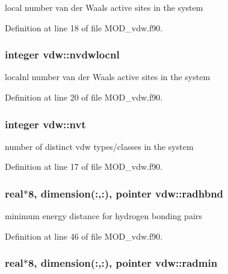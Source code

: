 local number van der Waals active sites in the system 



Definition at line 18 of file M\-O\-D\-\_\-vdw.\-f90.

\hypertarget{classvdw_ad9fb8b87e6260d7940ff961e4014ccda}{
\subsubsection[{nvdwlocnl}]{\setlength{\rightskip}{0pt plus 5cm}integer vdw\-::nvdwlocnl}}\label{classvdw_ad9fb8b87e6260d7940ff961e4014ccda}


localnl number van der Waals active sites in the system 



Definition at line 20 of file M\-O\-D\-\_\-vdw.\-f90.

\hypertarget{classvdw_a6d9a7d303d6bab7238b14f89965de887}{
\subsubsection[{nvt}]{\setlength{\rightskip}{0pt plus 5cm}integer vdw\-::nvt}}\label{classvdw_a6d9a7d303d6bab7238b14f89965de887}


number of distinct vdw types/classes in the system 



Definition at line 17 of file M\-O\-D\-\_\-vdw.\-f90.

\hypertarget{classvdw_ab306f3aa073b7317272454203b2dc5e7}{
\subsubsection[{radhbnd}]{\setlength{\rightskip}{0pt plus 5cm}real$\ast$8, dimension(\-:,\-:), pointer vdw\-::radhbnd}}\label{classvdw_ab306f3aa073b7317272454203b2dc5e7}


minimum energy distance for hydrogen bonding pairs 



Definition at line 46 of file M\-O\-D\-\_\-vdw.\-f90.

\hypertarget{classvdw_a481ad3e2f4a49e4955944495e0e7618e}{
\subsubsection[{radmin}]{\setlength{\rightskip}{0pt plus 5cm}real$\ast$8, dimension(\-:,\-:), pointer vdw\-::radmin}}\label{classvdw_a481ad3e2f4a49e4955944495e0e7618e}



